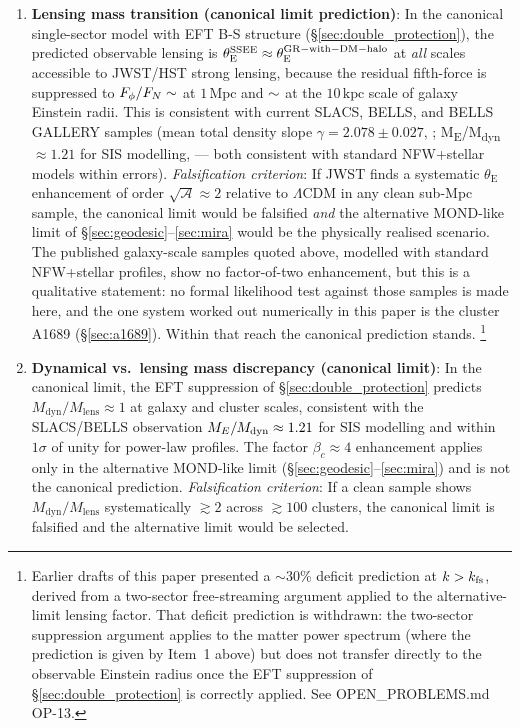 \documentclass[12pt,a4paper]{article}
\newcommand{\AURA}{\mathcal{A}}
\newcommand{\bc}{\beta_c}
\newcommand{\thetaE}{\theta_{\mathrm{E}}}
\begin{document}
\begin{enumerate}
  \item \textbf{Lensing mass transition (canonical limit prediction)}:
        In the canonical single-sector model with EFT B-S structure
        (\S\ref{sec:double_protection}), the predicted observable lensing
        is $\thetaE^{\rm SSEE}\approx\thetaE^{\rm GR-with-DM-halo}$ at
        \emph{all} scales accessible to JWST/HST strong lensing, because
        the residual fifth-force is suppressed to $F_\phi/F_N\sim\val{quinta_fuerza_Mpc}$ at $1\,\mathrm{Mpc}$ and $\sim\val{quinta_fuerza_10kpc}$ at the $10\,\mathrm{kpc}$ scale of galaxy Einstein radii. This is consistent with current SLACS, BELLS,
        and BELLS GALLERY samples (mean total density slope
        $\gamma=2.078\pm 0.027$, \citealt{Auger2010}; M\textsubscript{E}/M\textsubscript{dyn}
        $\approx 1.21$ for SIS modelling, \citealt{Li2018} — both consistent with standard NFW+stellar
        models within errors).
        \textit{Falsification criterion}: If JWST finds a systematic
        $\thetaE$ enhancement of order $\sqrt{\AURA}\approx 2$ relative to
        $\Lambda$CDM in any clean sub-Mpc sample, the canonical limit
        would be falsified \emph{and} the alternative MOND-like limit of
        \S\ref{sec:geodesic}--\ref{sec:mira} would be the physically
        realised scenario. The published galaxy-scale samples quoted above, modelled
        with standard NFW+stellar profiles, show no factor-of-two enhancement, but this
        is a qualitative statement: no formal likelihood test against those samples is
        made here, and the one system worked out numerically in this paper is the
        cluster A1689 (\S\ref{sec:a1689}). Within that reach the canonical prediction stands.
        \footnote{Earlier drafts of this paper presented a $\sim 30\%$
        deficit prediction at $k>k_{\rm fs}$, derived from a two-sector
        free-streaming argument applied to the alternative-limit lensing
        factor. That deficit prediction is withdrawn: the two-sector
        suppression argument applies to the matter power spectrum (where
        the prediction is given by Item~1 above) but does not transfer
        directly to the observable Einstein radius once the EFT
        suppression of \S\ref{sec:double_protection} is correctly applied.
        See OPEN\_PROBLEMS.md OP-13.}

  \item \textbf{Dynamical vs.\ lensing mass discrepancy (canonical limit)}:
        In the canonical limit, the EFT suppression of
        \S\ref{sec:double_protection} predicts $M_{\mathrm{dyn}}/M_{\mathrm{lens}}
        \approx 1$ at galaxy and cluster scales, consistent with the
        SLACS/BELLS observation $M_E/M_{\rm dyn}\approx 1.21$ for SIS
        modelling \citep{Li2018} and within $1\sigma$ of unity for
        power-law profiles. The factor $\bc\approx 4$ enhancement applies
        only in the alternative MOND-like limit
        (\S\ref{sec:geodesic}--\ref{sec:mira}) and is not the canonical
        prediction.
        \textit{Falsification criterion}: If a clean sample shows
        $M_{\mathrm{dyn}}/M_{\mathrm{lens}}$ systematically $\gtrsim 2$
        across $\gtrsim 100$ clusters, the canonical limit
        is falsified and the alternative limit would be selected.


\end{enumerate}
\end{document}
